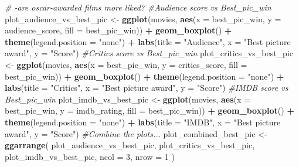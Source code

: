 \documentclass[]{article}
\newenvironment{Shaded}{\begin{snugshade}}{\end{snugshade}}
\newcommand{\KeywordTok}[1]{\textcolor[rgb]{0.13,0.29,0.53}{\textbf{#1}}}
\newcommand{\DataTypeTok}[1]{\textcolor[rgb]{0.13,0.29,0.53}{#1}}
\newcommand{\DecValTok}[1]{\textcolor[rgb]{0.00,0.00,0.81}{#1}}
\newcommand{\StringTok}[1]{\textcolor[rgb]{0.31,0.60,0.02}{#1}}
\newcommand{\CommentTok}[1]{\textcolor[rgb]{0.56,0.35,0.01}{\textit{#1}}}
\newcommand{\OperatorTok}[1]{\textcolor[rgb]{0.81,0.36,0.00}{\textbf{#1}}}
\newcommand{\NormalTok}[1]{#1}
\begin{document}
\begin{Shaded}
\begin{Highlighting}[]
\CommentTok{# -are oscar-awarded films more liked?}
\CommentTok{#Audience score vs Best_pic_win}
\NormalTok{plot_audience_vs_best_pic <-}
\StringTok{  }\KeywordTok{ggplot}\NormalTok{(movies,}
         \KeywordTok{aes}\NormalTok{(}\DataTypeTok{x =}\NormalTok{ best_pic_win, }\DataTypeTok{y =}\NormalTok{ audience_score, }\DataTypeTok{fill =}\NormalTok{ best_pic_win)) }\OperatorTok{+}\StringTok{ }\KeywordTok{geom_boxplot}\NormalTok{() }\OperatorTok{+}\StringTok{ }\KeywordTok{theme}\NormalTok{(}\DataTypeTok{legend.position =} \StringTok{"none"}\NormalTok{) }\OperatorTok{+}\StringTok{ }\KeywordTok{labs}\NormalTok{(}\DataTypeTok{title =} \StringTok{"Audience"}\NormalTok{, }\DataTypeTok{x =} \StringTok{"Best picture award"}\NormalTok{, }\DataTypeTok{y =} \StringTok{"Score"}\NormalTok{)}
\CommentTok{#Critics score vs Best_pic_win}
\NormalTok{plot_critics_vs_best_pic <-}
\StringTok{  }\KeywordTok{ggplot}\NormalTok{(movies,}
         \KeywordTok{aes}\NormalTok{(}\DataTypeTok{x =}\NormalTok{ best_pic_win, }\DataTypeTok{y =}\NormalTok{ critics_score, }\DataTypeTok{fill =}\NormalTok{ best_pic_win)) }\OperatorTok{+}\StringTok{ }\KeywordTok{geom_boxplot}\NormalTok{() }\OperatorTok{+}\StringTok{ }\KeywordTok{theme}\NormalTok{(}\DataTypeTok{legend.position =} \StringTok{"none"}\NormalTok{) }\OperatorTok{+}\StringTok{ }\KeywordTok{labs}\NormalTok{(}\DataTypeTok{title =} \StringTok{"Critics"}\NormalTok{, }\DataTypeTok{x =} \StringTok{"Best picture award"}\NormalTok{, }\DataTypeTok{y =} \StringTok{"Score"}\NormalTok{)}
\CommentTok{#IMDB score vs Best_pic_win}
\NormalTok{plot_imdb_vs_best_pic <-}
\StringTok{  }\KeywordTok{ggplot}\NormalTok{(movies, }\KeywordTok{aes}\NormalTok{(}\DataTypeTok{x =}\NormalTok{ best_pic_win, }\DataTypeTok{y =}\NormalTok{ imdb_rating, }\DataTypeTok{fill =}\NormalTok{ best_pic_win)) }\OperatorTok{+}
\StringTok{  }\KeywordTok{geom_boxplot}\NormalTok{() }\OperatorTok{+}\StringTok{ }\KeywordTok{theme}\NormalTok{(}\DataTypeTok{legend.position =} \StringTok{"none"}\NormalTok{) }\OperatorTok{+}\StringTok{ }\KeywordTok{labs}\NormalTok{(}\DataTypeTok{title =} \StringTok{"IMDB"}\NormalTok{, }\DataTypeTok{x =} \StringTok{"Best picture award"}\NormalTok{, }\DataTypeTok{y =} \StringTok{"Score"}\NormalTok{)}
\CommentTok{#Combine the plots...}
\NormalTok{plot_combined_best_pic <-}
\StringTok{  }\KeywordTok{ggarrange}\NormalTok{(}
\NormalTok{    plot_audience_vs_best_pic,}
\NormalTok{    plot_critics_vs_best_pic,}
\NormalTok{    plot_imdb_vs_best_pic,}
    \DataTypeTok{ncol =} \DecValTok{3}\NormalTok{,}
    \DataTypeTok{nrow =} \DecValTok{1}
\NormalTok{  )}


\end{Highlighting}
\end{Shaded}
\end{document}
